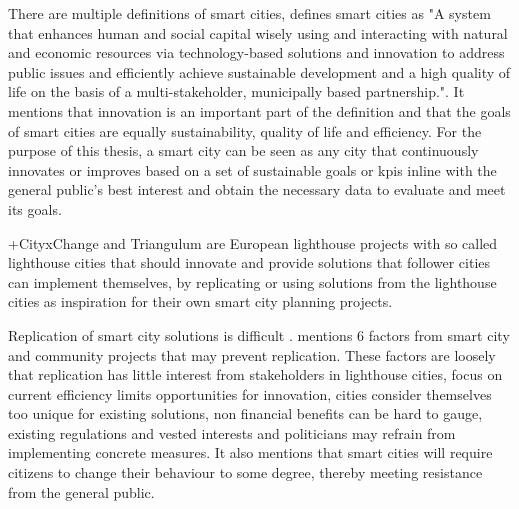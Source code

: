 There are multiple definitions of smart cities, \cite{fernandez2016stakeholders} defines smart cities as "A system that enhances human and social capital wisely using and interacting with natural and economic resources via technology-based solutions and innovation to address public issues and efficiently achieve sustainable development and a high quality of life on the basis of a multi-stakeholder, municipally based partnership."\cite[p.~164]{fernandez2016stakeholders}. It mentions that innovation is an important part of the definition and that the goals of smart cities are equally sustainability, quality of life and efficiency. For the purpose of this thesis, a smart city can be seen as any city that continuously innovates or improves based on a set of sustainable goals or \glspl{kpi} inline with the general public's best interest and obtain the necessary data to evaluate and meet its goals.

+CityxChange and Triangulum are European lighthouse projects with so called lighthouse cities that should innovate and provide solutions that follower cities can implement themselves, by replicating or using solutions from the lighthouse cities as inspiration for their own smart city planning projects.

Replication of smart city solutions is difficult \cite{vandevyvere2018may}. \cite{vandevyvere2018may} mentions 6 factors from smart city and community projects that may prevent replication. These factors are loosely that replication has little interest from stakeholders in lighthouse cities, focus on current efficiency limits opportunities for innovation, cities consider themselves too unique for existing solutions, non financial benefits can be hard to gauge, existing regulations and vested interests and politicians may refrain from implementing concrete measures.
It also mentions that smart cities will require citizens to change their behaviour to some degree, thereby meeting resistance from the general public.

